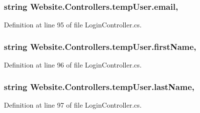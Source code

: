\subsubsection[{email}]{\setlength{\rightskip}{0pt plus 5cm}string Website.\+Controllers.\+temp\+User.\+email\hspace{0.3cm}{\ttfamily [get]}, {\ttfamily [set]}}\label{class_website_1_1_controllers_1_1temp_user_afe48fbce2a792f6d67380c845aafc3b0}


Definition at line 95 of file Login\+Controller.\+cs.

\hypertarget{class_website_1_1_controllers_1_1temp_user_aeae4b72c886947233a76374d143ff69d}{}
\subsubsection[{first\+Name}]{\setlength{\rightskip}{0pt plus 5cm}string Website.\+Controllers.\+temp\+User.\+first\+Name\hspace{0.3cm}{\ttfamily [get]}, {\ttfamily [set]}}\label{class_website_1_1_controllers_1_1temp_user_aeae4b72c886947233a76374d143ff69d}


Definition at line 96 of file Login\+Controller.\+cs.

\hypertarget{class_website_1_1_controllers_1_1temp_user_a6cece23aea0cf209255c46e5aea62738}{}
\subsubsection[{last\+Name}]{\setlength{\rightskip}{0pt plus 5cm}string Website.\+Controllers.\+temp\+User.\+last\+Name\hspace{0.3cm}{\ttfamily [get]}, {\ttfamily [set]}}\label{class_website_1_1_controllers_1_1temp_user_a6cece23aea0cf209255c46e5aea62738}


Definition at line 97 of file Login\+Controller.\+cs.

\hypertarget{class_website_1_1_controllers_1_1temp_user_a04df23ef3edb53782d266efcee34d660}{}
